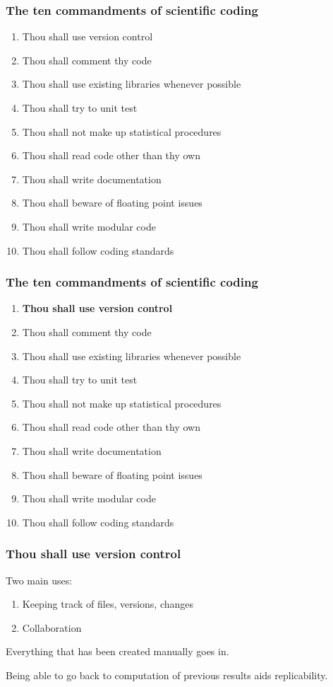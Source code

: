 \documentclass[slidestop]{beamer}
\begin{document}
\begin{frame}
  \frametitle{The ten commandments of scientific coding}
  \begin{enumerate}
    \item Thou shall use version control
    \item Thou shall comment thy code
    \item Thou shall use existing libraries whenever possible
    \item Thou shall try to unit test
    \item Thou shall not make up statistical procedures
    \item Thou shall read code other than thy own
    \item Thou shall write documentation
    \item Thou shall beware of floating point issues
    \item Thou shall write modular code
    \item Thou shall follow coding standards
  \end{enumerate}
\end{frame}

\begin{frame}
  \frametitle{The ten commandments of scientific coding}
  \begin{enumerate}
    \item {\bf Thou shall use version control}
    \item Thou shall comment thy code
    \item Thou shall use existing libraries whenever possible
    \item Thou shall try to unit test
    \item Thou shall not make up statistical procedures
    \item Thou shall read code other than thy own
    \item Thou shall write documentation
    \item Thou shall beware of floating point issues
    \item Thou shall write modular code
    \item Thou shall follow coding standards
  \end{enumerate}
\end{frame}

\begin{frame}
  \frametitle{Thou shall use version control}
  Two main uses:
  \pause
  \begin{enumerate}[<+->]
    \item Keeping track of files, versions, changes
    \item Collaboration
  \end{enumerate}

  \vspace{1cm}
  \pause

  Everything that has been created manually goes in.

  \vspace{1cm}
  \pause

  Being able to go back to computation of previous results aids
  replicability.
\end{frame}
\end{document}
